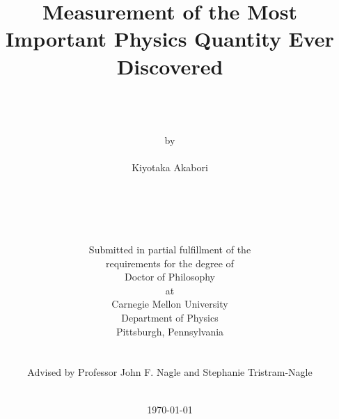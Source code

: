 \documentclass[12pt,twoside]{report}
\author{\\
	\\
	\\
	by \\
	\\
      	Kiyotaka Akabori \\
	\\
	\\
	\\
	\\
	\\
        Submitted in partial fulfillment of the \\
        requirements for the degree of \\
        Doctor of Philosophy \\
        at \\
        Carnegie Mellon University \\
        Department of Physics \\
        Pittsburgh, Pennsylvania \\
	\\
        \\
	Advised by Professor John F. Nagle and Stephanie Tristram-Nagle
	\\
	\\
}
\title{\bf{
Measurement of the Most Important Physics Quantity Ever Discovered 
}}
\date{\today}
\begin{document}
 

\thispagestyle{empty}

\maketitle


\thispagestyle{empty} \cleardoublepage

%

%


\thispagestyle{empty} \cleardoublepage


%

%


\tableofcontents 

\listoftables

\listoffigures

\clearpage 







\begin{appendices}
  
\end{appendices}



\end{document}
